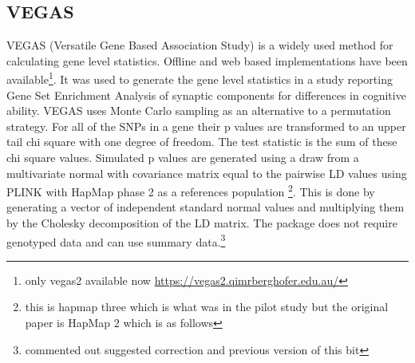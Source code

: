 \subsection{VEGAS}
\label{sec:VEGAS_gene_scores}
VEGAS (Versatile Gene Based Association Study) is a widely used   method for calculating gene level statistics. Offline and web based implementations have been available\footnote{only vegas2 available now \url{https://vegas2.qimrberghofer.edu.au/}}.  It was used  to generate the gene level statistics in a study  reporting Gene Set Enrichment Analysis \cite{subramanian2005gene}  of synaptic components for differences in cognitive ability\cite{hill2014human}. VEGAS uses Monte Carlo sampling as an alternative to a permutation strategy. For all of the SNPs in a gene their p values are transformed to an upper tail chi square with one degree of freedom. The test statistic is the sum of these chi square values. Simulated p values are generated using a draw from a multivariate normal with covariance matrix equal to the pairwise LD values using PLINK\cite{purcell2007plink} with HapMap phase 2 as a references population \cite{international2010integrating}\footnote{this is hapmap three which is what was in the pilot study but the original paper is HapMap 2 which is as follows}\cite{international2007second}. This is done by generating a vector of independent standard normal values and multiplying them by the Cholesky decomposition of the LD matrix. The package does not require genotyped data and can use summary data.\footnote{commented out suggested correction and previous version of this bit}%

